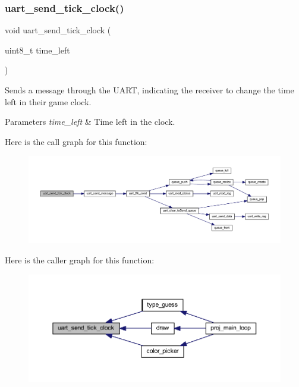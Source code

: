 \subsubsection{\texorpdfstring{uart\+\_\+send\+\_\+tick\+\_\+clock()}{uart\_send\_tick\_clock()}}
{\footnotesize\ttfamily void uart\+\_\+send\+\_\+tick\+\_\+clock (\begin{DoxyParamCaption}\item[{uint8\+\_\+t}]{time\+\_\+left }\end{DoxyParamCaption})}



Sends a message through the U\+A\+RT, indicating the receiver to change the time left in their game clock. 


\begin{DoxyParams}{Parameters}
{\em time\+\_\+left} & Time left in the clock. \\
\hline
\end{DoxyParams}
Here is the call graph for this function\+:\nopagebreak
\begin{figure}[H]
\begin{center}
\leavevmode
\includegraphics[width=350pt]{group__uart__wordgame_gaecefc87c97278f130cc9b72b8fa413c8_cgraph}
\end{center}
\end{figure}
Here is the caller graph for this function\+:\nopagebreak
\begin{figure}[H]
\begin{center}
\leavevmode
\includegraphics[width=350pt]{group__uart__wordgame_gaecefc87c97278f130cc9b72b8fa413c8_icgraph}
\end{center}
\end{figure}
\mbox{\label{group__uart__wordgame_ga8fbae13c273fbb60f7e2935a8092f782}} 
